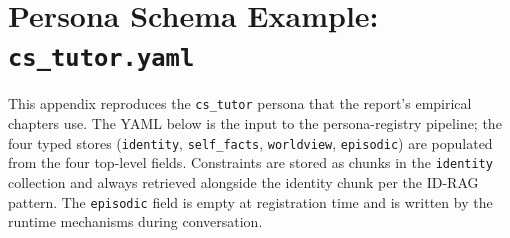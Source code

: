 \chapter{Persona Schema Example: \texttt{cs\_tutor.yaml}}
\label{app:persona-schema}

This appendix reproduces the \texttt{cs\_tutor} persona that the report's empirical chapters use. The YAML below is the input to the persona-registry pipeline; the four typed stores (\texttt{identity}, \texttt{self\_facts}, \texttt{worldview}, \texttt{episodic}) are populated from the four top-level fields. Constraints are stored as chunks in the \texttt{identity} collection and always retrieved alongside the identity chunk per the ID-RAG pattern. The \texttt{episodic} field is empty at registration time and is written by the runtime mechanisms during conversation.

